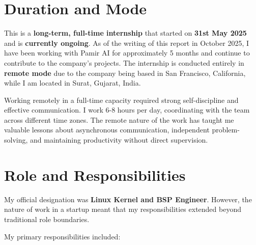 \documentclass[12pt,a4paper]{report}
\begin{document}
\section{Duration and Mode}

This is a \textbf{long-term, full-time internship} that started on \textbf{31st May 2025} and is \textbf{currently ongoing}. As of the writing of this report in October 2025, I have been working with Pamir AI for approximately 5 months and continue to contribute to the company's projects. The internship is conducted entirely in \textbf{remote mode} due to the company being based in San Francisco, California, while I am located in Surat, Gujarat, India.

\vspace{0.3cm}

Working remotely in a full-time capacity required strong self-discipline and effective communication. I work 6-8 hours per day, coordinating with the team across different time zones. The remote nature of the work has taught me valuable lessons about asynchronous communication, independent problem-solving, and maintaining productivity without direct supervision.

\section{Role and Responsibilities}

My official designation was \textbf{Linux Kernel and BSP Engineer}. However, the nature of work in a startup meant that my responsibilities extended beyond traditional role boundaries.

\vspace{0.3cm}

My primary responsibilities included:
\end{document}
